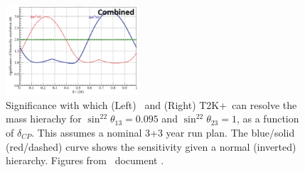 \begin{figure}\begin{center}
\includegraphics[width=0.44\textwidth]{RNC/t2knova.pdf}
\caption{Significance with which (Left) \NOvA\ and (Right) T2K+\NOvA\ can resolve the mass hierachy for  $\sin^22\theta_{13}=0.095$ and $\sin^22\theta_{23}=1$, as a function of $\delta_{CP}$. This assumes a nominal 3+3 year run plan. The blue/solid (red/dashed) curve shows the sensitivity given a normal (inverted) hierarchy. 
Figures from \NOvA\ document \cite{patterson}. \label{fig_seven}}
\end{center}
\end{figure}



